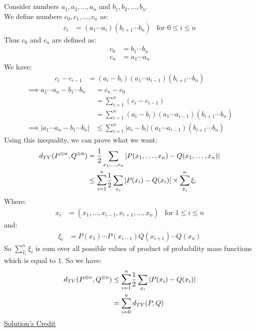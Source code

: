 \documentclass{article}
\numberwithin{equation}{section}
\begin{document}
\subsection{}
Consider numbers \(a_1, a_2, \ldots, a_n\) and \(b_1, b_2, \ldots, b_n\).\\
We define numbers \(c_0, c_1, \ldots, c_n\) as:
\begin{align}
c_i &= (a_1  \cdots  a_i)(b_{i+1} \cdots b_n) & \text{for } 0 \le i \le n
\end{align}
Thus \(c_0\) and \(c_n\) are defined as:
\begin{align}
c_0 &= b_1 \cdots b_n\\
c_n &= a_1 \cdots a_n
\end{align}
We have:
\begin{align}
c_i - c_{i-1} &= (a_i - b_i)(a_1  \cdots  a_{i-1})(b_{i+1} \cdots b_n)
\end{align}
\begin{align}
\implies a_1 \cdots a_n - b_1 \cdots b_n &= c_n - c_0\\
&= \sum_{i=1}^n (c_i - c_{i-1})\\
&= \sum_{i=1}^n (a_i - b_i)(a_1  \cdots  a_{i-1})(b_{i+1} \cdots b_n)\\
\implies \vert a_1 \cdots a_n - b_1 \cdots b_n \vert & \le  \sum_{i=1}^n \vert a_i - b_i \vert(a_1  \cdots  a_{i-1})(b_{i+1} \cdots b_n)
\end{align} 
Using this inequality, we can prove what we want:
\begin{align}
d_{TV}(P^{\otimes n}, Q^{\otimes n}) &= \frac{1}{2}\sum_{x_1, \ldots, x_n} \vert P(x_1, \ldots, x_n) - Q(x_1, \ldots, x_n) \vert\\
& \le \mathlarger{\sum}_{i=1}^n \frac{1}{2} \sum_{x_i} \vert P(x_i) - Q(x_i) \vert \times \sum_{\hat{x}_i}^n \xi_i
\end{align}
Where:
\begin{align}
\hat{x}_i &= (x_1, \ldots, x_{i-1}, x_{i+1}, \ldots, x_n) & \text{for } 1 \le i \le n
\end{align}
and:
\begin{align}
\xi_i &= P(x_1) \cdots P(x_{i-1}) Q(x_{i+1}) \cdots Q(x_n)
\end{align}
So \(\sum_{\hat{x}_i}^n \xi_i\) is sum over all possible values of product of probability mass functions which is equal to \(1\). So we have:
\begin{align}
d_{TV}(P^{\otimes n}, Q^{\otimes n}) &\le \mathlarger{\sum}_{i=1}^n \frac{1}{2}\sum_{x_i} \vert P(x_i) - Q(x_i) \vert\\
&= \sum_{i=0}^n d_{TV}(P, Q)
\end{align}
{\color{blue}\href{https://math.stackexchange.com/questions/72315/total-variation-inequality-for-the-product-measure}{Solution's Credit}}
\end{document}
